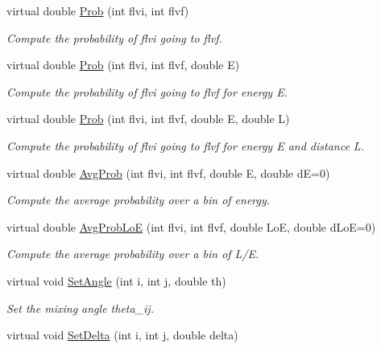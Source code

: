 \begin{DoxyCompactItemize}
virtual double \hyperlink{classOscProb_1_1PMNS__Base_aec5c399b93261f1962a4b7dbbb44b973}{Prob} (int flvi, int flvf)
\begin{DoxyCompactList}\small\item\em Compute the probability of flvi going to flvf. \end{DoxyCompactList}\item 
virtual double \hyperlink{classOscProb_1_1PMNS__Base_aa3cee10639d5c0879ccb9e78d62128d3}{Prob} (int flvi, int flvf, double E)
\begin{DoxyCompactList}\small\item\em Compute the probability of flvi going to flvf for energy E. \end{DoxyCompactList}\item 
virtual double \hyperlink{classOscProb_1_1PMNS__Base_a6e0a74508d9d6db7be02e242b8467563}{Prob} (int flvi, int flvf, double E, double L)
\begin{DoxyCompactList}\small\item\em Compute the probability of flvi going to flvf for energy E and distance L. \end{DoxyCompactList}\item 
virtual double \hyperlink{classOscProb_1_1PMNS__Base_ac03f754160422e6600da8dbae0f803ed}{Avg\+Prob} (int flvi, int flvf, double E, double dE=0)
\begin{DoxyCompactList}\small\item\em Compute the average probability over a bin of energy. \end{DoxyCompactList}\item 
virtual double \hyperlink{classOscProb_1_1PMNS__Base_ac19a92f4ef428a7333ca8eed76fca637}{Avg\+Prob\+LoE} (int flvi, int flvf, double LoE, double d\+LoE=0)
\begin{DoxyCompactList}\small\item\em Compute the average probability over a bin of L/E. \end{DoxyCompactList}\item 
virtual void \hyperlink{classOscProb_1_1PMNS__Base_ace7875cf6d3bec161a2b7ed2690aec34}{Set\+Angle} (int i, int j, double th)
\begin{DoxyCompactList}\small\item\em Set the mixing angle theta\+\_\+ij. \end{DoxyCompactList}\item 
virtual void \hyperlink{classOscProb_1_1PMNS__Base_a4bef78cfcfc4e70b4ce79cdb8862c0a3}{Set\+Delta} (int i, int j, double delta)

\end{DoxyCompactItemize}
